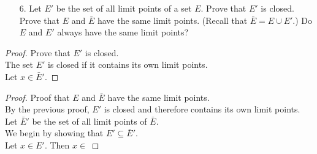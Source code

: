 \documentclass[10pt]{article}
\theoremstyle{definition}
\theoremstyle{plain}
\begin{document}
\pagebreak



\begin{enumerate}
\item[6.] Let $E'$ be the set of all limit points of a set $E$. Prove that $E'$ is closed. Prove that $E$ and $\bar{E}$ have the same limit points. (Recall that $\bar{E} = E \cup E'.$) Do $E$ and $E'$ always have the same limit points?
\end{enumerate}

\begin{proof}
Prove that $E'$ is closed. \\

The set $E'$ is closed if it contains its own limit points. \\

Let $x\in \bar{E}'$.




\end{proof}

\begin{proof}
Proof that $E$ and $\bar{E}$ have the same limit points. \\

By the previous proof, $E'$ is closed and therefore contains its own limit points. \\

Let $\bar{E}'$ be the set of all limit points of $\bar{E}$. \\

We begin by showing that $E'\subseteq \bar{E}'$. \\

Let $x\in E'$. Then $x\in  $

\end{proof}
\end{document}
